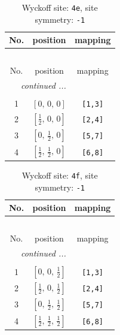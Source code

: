 \documentclass[fleqn,8pt]{jsarticle}
\begin{document}
\begin{longtable}{ccc}
\caption{Wyckoff site: {\tt 4e}, site symmetry: {\tt -1}}
 \\
 \hline \hline
No. & position & mapping \\ \hline \endfirsthead

\multicolumn{2}{l}{\tablename\ \thetable{}} \\
 \hline \hline
No. & position & mapping \\ \hline \endhead

 \hline \hline
\multicolumn{2}{r}{\footnotesize\it continued ...} \\ \endfoot

 \hline \hline
\multicolumn{2}{r}{} \\ \endlastfoot

1 & $\left[ 0,\, 0,\, 0 \right]$ & {\tt [1,3]} \\ \hline
2 & $\left[ \frac{1}{2},\, 0,\, 0 \right]$ & {\tt [2,4]} \\ \hline
3 & $\left[ 0,\, \frac{1}{2},\, 0 \right]$ & {\tt [5,7]} \\ \hline
4 & $\left[ \frac{1}{2},\, \frac{1}{2},\, 0 \right]$ & {\tt [6,8]} \\
\end{longtable}
\renewcommand{\arraystretch}{1.2}
\begin{longtable}{ccc}
\caption{Wyckoff site: {\tt 4f}, site symmetry: {\tt -1}}
 \\
 \hline \hline
No. & position & mapping \\ \hline \endfirsthead

\multicolumn{2}{l}{\tablename\ \thetable{}} \\
 \hline \hline
No. & position & mapping \\ \hline \endhead

 \hline \hline
\multicolumn{2}{r}{\footnotesize\it continued ...} \\ \endfoot

 \hline \hline
\multicolumn{2}{r}{} \\ \endlastfoot

1 & $\left[ 0,\, 0,\, \frac{1}{2} \right]$ & {\tt [1,3]} \\ \hline
2 & $\left[ \frac{1}{2},\, 0,\, \frac{1}{2} \right]$ & {\tt [2,4]} \\ \hline
3 & $\left[ 0,\, \frac{1}{2},\, \frac{1}{2} \right]$ & {\tt [5,7]} \\ \hline
4 & $\left[ \frac{1}{2},\, \frac{1}{2},\, \frac{1}{2} \right]$ & {\tt [6,8]} \\
\end{longtable}
\end{document}
